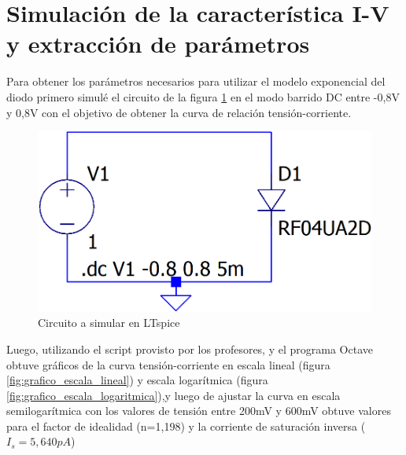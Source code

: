 \documentclass[10pt]{article}
\begin{document}
\section{Simulación de la característica I-V y extracción de parámetros}
\quad Para obtener los parámetros necesarios para utilizar el modelo exponencial del diodo primero simulé el circuito de la figura \ref{fig:circuito_simulacion_spice} en el modo barrido DC entre -0,8V y 0,8V con el objetivo de obtener la curva de relación tensión-corriente.

\begin{figure}[ht!]
    \centering
    \includegraphics[width=0.4\linewidth]{resources/circuito_simulacion_spice.png}
    \caption{Circuito a simular en LTspice}
    \label{fig:circuito_simulacion_spice}
\end{figure}

\quad Luego, utilizando el script provisto por los profesores, y el programa Octave obtuve gráficos de la curva tensión-corriente en escala lineal (figura \ref{fig:grafico_escala_lineal}) y escala logarítmica (figura \ref{fig:grafico_escala_logaritmica}),y luego de ajustar la curva en escala semilogarítmica con los valores de tensión entre 200mV y 600mV obtuve valores para el factor de idealidad (n=1,198) y la corriente de saturación inversa ($I_s = 5,640pA$)
\end{document}
